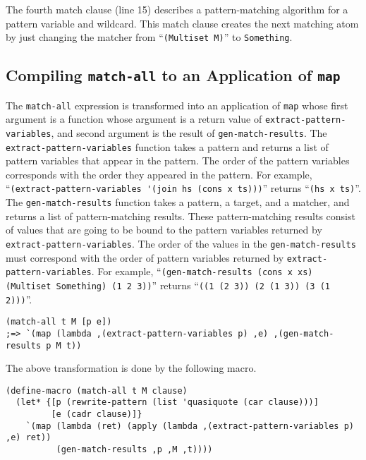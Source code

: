 \documentclass[acmlarge]{acmart}
\newcommand{\new}[1]{\textcolor{blue}{#1}}
\begin{document}
The fourth match clause (line 15) describes a pattern-matching algorithm for a pattern variable and wildcard.
This match clause creates the next matching atom by just changing the matcher from ``\lstinline{(Multiset M)}'' to \lstinline{Something}.

\subsection{Compiling \lstinline{match-all} to an Application of \lstinline{map}}\label{method-map}

The \lstinline{match-all} expression is transformed into an application of \lstinline{map} whose first argument is a function whose argument is a return value of \lstinline{extract-pattern-variables}, and second argument is the result of \lstinline{gen-match-results}.
The \lstinline{extract-pattern-variables} function takes a pattern and returns a list of pattern variables that appear in the pattern.
The order of the pattern variables corresponds with the order they appeared in the pattern.
For example, ``\lstinline{(extract-pattern-variables '(join hs (cons x ts)))}'' returns ``\lstinline{(hs x ts)}''.
The \lstinline{gen-match-results} function takes a pattern, a target, and a matcher, and returns a list of pattern-matching results.
These pattern-matching results consist of values that are going to be bound to the pattern variables returned by \lstinline{extract-pattern-variables}.
The order of the values in the \lstinline{gen-match-results} must correspond with the order of pattern variables returned by \lstinline{extract-pattern-variables}.
For example, ``\lstinline{(gen-match-results (cons x xs) (Multiset Something) (1 2 3))}'' returns ``\lstinline{((1 (2 3)) (2 (1 3)) (3 (1 2)))}''.

\begin{lstlisting}[language=egison]
(match-all t M [p e])
;=> `(map (lambda ,(extract-pattern-variables p) ,e) ,(gen-match-results p M t))
\end{lstlisting}

\noindent The above transformation is done by the following macro.

\begin{lstlisting}[language=egison]
(define-macro (match-all t M clause)
  (let* {[p (rewrite-pattern (list 'quasiquote (car clause)))]
         [e (cadr clause)]}
    `(map (lambda (ret) (apply (lambda ,(extract-pattern-variables p) ,e) ret))
          (gen-match-results ,p ,M ,t))))
\end{lstlisting}
\end{document}
